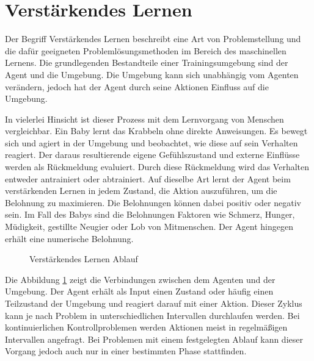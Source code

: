 \section{Verstärkendes Lernen}
\label{sec:rl}
Der Begriff \grqq{}Verstärkendes Lernen\grqq{} beschreibt eine Art von Problemstellung und die dafür geeigneten Problemlösungsmethoden im Bereich des maschinellen Lernens. Die grundlegenden Bestandteile einer Trainingsumgebung sind der Agent und die Umgebung. Die Umgebung kann sich unabhängig vom Agenten verändern, jedoch hat der Agent durch seine Aktionen Einfluss auf die Umgebung.

In vielerlei Hinsicht ist dieser Prozess mit dem Lernvorgang von Menschen vergleichbar. Ein Baby lernt das Krabbeln ohne direkte Anweisungen. Es bewegt sich und agiert in der Umgebung und beobachtet, wie diese auf sein Verhalten reagiert. Der daraus resultierende eigene Gefühlszustand und externe Einflüsse werden als Rückmeldung evaluiert. Durch diese Rückmeldung wird das Verhalten entweder antrainiert oder abtrainiert. Auf dieselbe Art lernt der Agent beim verstärkenden Lernen in jedem Zustand, die Aktion auszuführen, um die Belohnung zu maximieren. Die Belohnungen können dabei positiv oder negativ sein. Im Fall des Babys sind die Belohnungen Faktoren wie Schmerz, Hunger, Müdigkeit, gestillte Neugier oder Lob von Mitmenschen. Der Agent hingegen erhält eine numerische Belohnung.\cite{sutton2018reinforcement}

\begin{figure}[H]
  \centering
  \caption{Verstärkendes Lernen Ablauf}
  \label{fig:vl_ablauf}
\end{figure}

Die Abbildung \ref{fig:vl_ablauf} zeigt die Verbindungen zwischen dem Agenten und der Umgebung. Der Agent erhält als Input einen Zustand oder häufig einen Teilzustand der Umgebung und reagiert darauf mit einer Aktion. Dieser Zyklus kann je nach Problem in unterschiedlichen Intervallen durchlaufen werden. Bei kontinuierlichen Kontrollproblemen werden Aktionen meist in regelmäßigen Intervallen angefragt. Bei Problemen mit einem festgelegten Ablauf kann dieser Vorgang jedoch auch nur in einer bestimmten Phase stattfinden.

\newpage